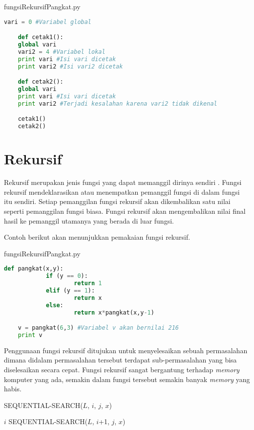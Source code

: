 \begin{listprog}{fungsiRekursifPangkat.py}
	\label{lst:fungsiRekursifPangkat}
	\begin{lstlisting}[language=Python]
	vari = 0 #Variabel global

	def cetak1():
    global vari
    vari2 = 4 #Variabel lokal
    print vari #Isi vari dicetak
    print vari2 #Isi vari2 dicetak

	def cetak2():
    global vari
    print vari #Isi vari dicetak
    print vari2 #Terjadi kesalahan karena vari2 tidak dikenal

	cetak1()
	cetak2()
	\end{lstlisting}
\end{listprog}

\section{Rekursif}

Rekursif merupakan jenis fungsi yang dapat memanggil dirinya sendiri . Fungsi rekursif mendeklarasikan atau menempatkan pemanggil fungsi di dalam fungsi itu sendiri. Setiap pemanggilan fungsi rekursif akan dikembalikan satu nilai seperti pemanggilan fungsi biasa. Fungsi rekursif akan mengembalikan nilai final hasil ke pemanggil utamanya yang berada di luar fungsi. 

Contoh berikut akan menunjukkan pemakaian fungsi rekursif.

\begin{listprog}{fungsiRekursifPangkat.py}
	\label{lst:fungsiRekursifPangkat}
	\begin{lstlisting}[language=Python]
	def pangkat(x,y):
			if (y == 0):
					return 1
			elif (y == 1):
					return x
			else:
					return x*pangkat(x,y-1)

	v = pangkat(6,3) #Variabel v akan bernilai 216
	print v
	\end{lstlisting}
\end{listprog}

Penggunaan fungsi rekursif ditujukan untuk menyelesaikan sebuah permasalahan dimana didalam permasalahan tersebut terdapat sub-permasalahan yang bisa diselesaikan secara cepat. Fungsi rekursif sangat bergantung terhadap \textit{memory} komputer yang ada, semakin dalam fungsi tersebut semakin banyak \textit{memory} yang habis.

\begin{algorithm}
	\caption{SEQUENTIAL-SEARCH($L$, $i$, $j$, $x$)}
	\label{algo:seq-search}
	\begin{algorithmic}[1]
			\RETURN $i$
		\ELSE
			\RETURN SEQUENTIAL-SEARCH($L$, $i$+1, $j$, $x$)
		\ENDIF
	\ELSE
	\ENDIF	
	\end{algorithmic}
\end{algorithm}



